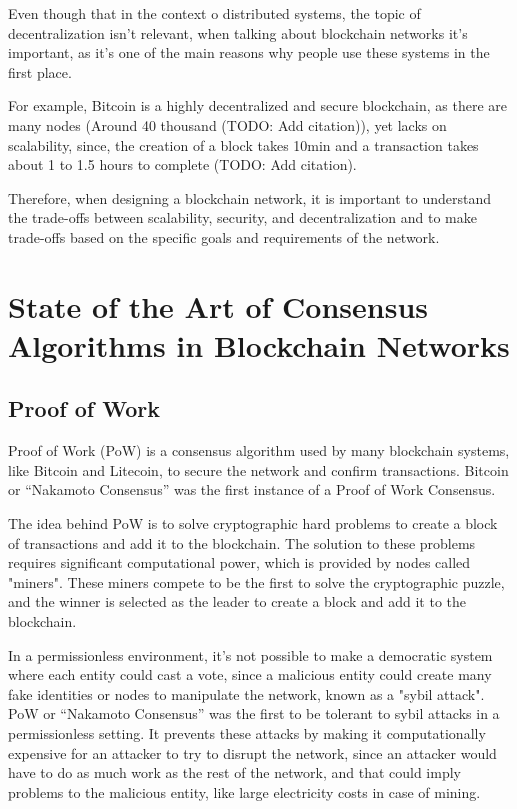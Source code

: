 Even though that in the context o distributed systems, the topic of decentralization isn't relevant, when talking about blockchain networks it's important, as it's one of the main reasons why people use these systems in the first place.

For example, Bitcoin is a highly decentralized and secure blockchain, as there are many nodes (Around 40 thousand (TODO: Add citation)), yet lacks on scalability, since, the creation of a block takes 10min and a transaction takes about 1 to 1.5 hours to complete (TODO: Add citation).

Therefore, when designing a blockchain network, it is important to understand the trade-offs between scalability, security, and decentralization and to make trade-offs based on the specific goals and requirements of the network.



\section{State of the Art of Consensus Algorithms in Blockchain Networks}


\subsection{\textbf{Proof of Work}}
Proof of Work (PoW) is a consensus algorithm used by many blockchain systems, like Bitcoin and Litecoin, to secure the network and confirm transactions.
Bitcoin or ``Nakamoto Consensus'' was the first instance of a Proof of Work Consensus.

The idea behind PoW is to solve cryptographic hard problems to create a block of transactions and add it to the blockchain. The solution to these problems requires significant computational power, which is provided by nodes called "miners". These miners compete to be the first to solve the cryptographic puzzle, and the winner is selected as the leader to create a block and add it to the blockchain.

In a permissionless environment, it's not possible to make a democratic system where each entity could cast a vote, since a malicious entity could create many fake identities or nodes to manipulate the network, known as a "sybil attack".
PoW or ``Nakamoto Consensus'' was the first to be tolerant to sybil attacks in a permissionless setting.
It prevents these attacks by making it computationally expensive for an attacker to try to disrupt the network, since an attacker would have to do as much work as the rest of the network, and that could imply problems to the malicious entity, like large electricity costs in case of mining.

